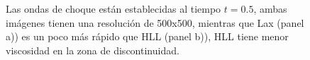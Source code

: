 \documentclass[12pt,a4paper]{book}
\begin{document}
\begin{figure}
\centering
{}
\caption{\label{fig:Lax-hll-newtoniano1}Las ondas de choque están establecidas al tiempo $t = 0.5$, ambas imágenes tienen una resolución de 500x500, mientras que Lax (panel a)) es un poco más rápido que HLL (panel b)), HLL tiene menor viscosidad en la zona de discontinuidad.}  
\end{figure}
\end{document}
